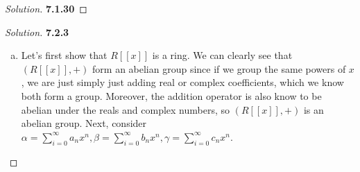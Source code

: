\documentclass[10pt]{article}
\theoremstyle{definition}
\theoremstyle{remark}
\newenvironment{solution}
  {\renewcommand\qedsymbol{$\blacksquare$}\begin{proof}[Solution]}
  {\end{proof}}
\begin{document}
\begin{solution}
\textbf{7.1.30}
\end{solution}

\begin{solution}
\textbf{7.2.3}
\begin{enumerate}[a)]
    \item Let's first show that $R[[x]]$ is a ring. We can clearly see that $(R[[x]],+)$ form an abelian group since if we group the same powers of $x$, we are just simply just adding real or complex coefficients, which we know both form a group. Moreover, the addition operator is also know to be abelian under the reals and complex numbers, so $(R[[x]],+)$ is an abelian group. Next, consider $\alpha = \sum_{i=0}^\infty a_nx^n, \beta = \sum_{i=0}^\infty b_nx^n, \gamma = \sum_{i=0}^\infty c_nx^n$.
    

\end{enumerate}
\end{solution}
\end{document}
